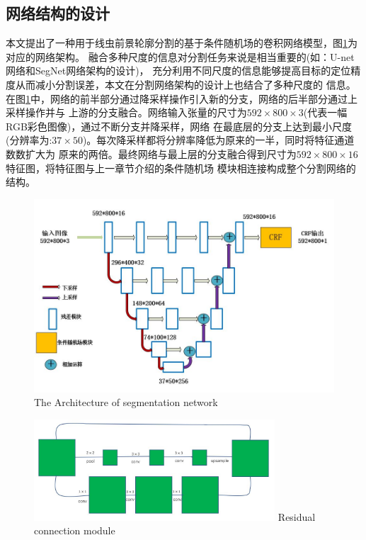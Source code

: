 \subsection{网络结构的设计}
	本文提出了一种用于线虫前景轮廓分割的基于条件随机场的卷积网络模型，图\ref{fig:chap5:arch}为对应的网络架构。
	融合多种尺度的信息对分割任务来说是相当重要的(如：U-net网络\cite{ronneberger2015u}和SegNet网络\cite{badrinarayanan2015segnet}架构的设计)，
	充分利用不同尺度的信息能够提高目标的定位精度从而减小分割误差，本文在分割网络架构的设计上也结合了多种尺度的
	信息。在图\ref{fig:chap5:arch}中，网络的前半部分通过降采样操作引入新的分支，网络的后半部分通过上采样操作并与
	上游的分支融合。网络输入张量的尺寸为$592\times800\times3$(代表一幅RGB彩色图像)，通过不断分支并降采样，网络
	在最底层的分支上达到最小尺度(分辨率为:$37\times50$)。每次降采样都将分辨率降低为原来的一半，同时将特征通道数数扩大为
	原来的两倍。最终网络与最上层的分支融合得到尺寸为$592\times800\times16$特征图，将特征图与上一章节介绍的条件随机场
	模块相连接构成整个分割网络的结构。
	\begin{figure}[thb]
	  \centering
	  \includegraphics[width=13cm]{figure/chap5/arch.jpg}
		{The Architecture of segmentation network}
	  \label{fig:chap5:arch}
	\end{figure}
	\begin{figure}[htb]
	  \centering
	  \includegraphics[width=9cm]{figure/chap4/residualpooling.jpg}
		{Residual connection module}
	  \label{fig:chap4:respool}
	\end{figure}
